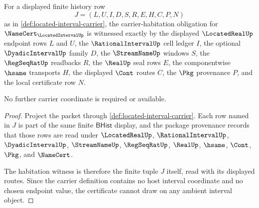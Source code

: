 \begin{theorem}
\label{thm:locatedinterval-carrier-habitation}
For a displayed finite history row
$$
J=(L,U,I,D,S,R,E,H,C,P,N)
$$
as in \autoref{def:located-interval-carrier}, the carrier-habitation obligation for $\NameCert_{\LocatedIntervalUp}$ is witnessed exactly by the displayed $\LocatedRealUp$ endpoint rows $L$ and $U$, the $\RationalIntervalUp$ cell ledger $I$, the optional $\DyadicIntervalUp$ family $D$, the $\StreamNameUp$ windows $S$, the $\RegSeqRatUp$ readbacks $R$, the $\RealUp$ seal rows $E$, the componentwise $\hsame$ transports $H$, the displayed $\Cont$ routes $C$, the $\Pkg$ provenance $P$, and the local certificate row $N$.

No further carrier coordinate is required or available.
\end{theorem}
\begin{proof}
Project the packet through \autoref{def:located-interval-carrier}. Each row named in $J$ is part of the same finite $\mathsf{BHist}$ display, and the package provenance records that those rows are read under $\LocatedRealUp$, $\RationalIntervalUp$, $\DyadicIntervalUp$, $\StreamNameUp$, $\RegSeqRatUp$, $\RealUp$, $\hsame$, $\Cont$, $\Pkg$, and $\NameCert$.

The habitation witness is therefore the finite tuple $J$ itself, read with its displayed routes. Since the carrier definition contains no host interval coordinate and no chosen endpoint value, the certificate cannot draw on any ambient interval object.
\end{proof}

